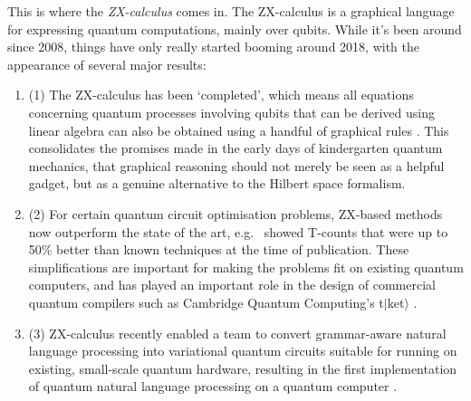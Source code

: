 \documentclass[11pt]{article}
\theoremstyle{definition}
\def\bR{\begin{color}{red}}
\def\bB{\begin{color}{blue}}
\def\e{\end{color}\xspace}
\newcommand{\ben}{\begin{enumerate}}
\newcommand{\een}{\end{enumerate}\par\noindent}
\newcommand{\TODOb}[1]{\marginpar{\scriptsize\bR \textbf{TODO:} #1\e}}
\begin{document}
This is where the \textit{ZX-calculus} comes in.
The ZX-calculus is a graphical language for expressing quantum computations, mainly over qubits. While it's been around since 2008, things have only really started booming around 2018, with the appearance of several major results: 
 \ben
 \item[(1)] The ZX-calculus has been `completed', which means all equations concerning quantum processes involving qubits that can be derived using linear algebra can also be obtained using a handful of graphical rules \cite{hadzihasanovic2018two, vilmart2019near}. This consolidates the promises made in the early days of kindergarten quantum mechanics, that graphical reasoning should not merely be seen as a helpful gadget, but as a genuine alternative to the Hilbert space formalism.
 \item[(2)] For certain quantum circuit optimisation  
 problems, 
 ZX-based methods now outperform the state of the art, e.g.~\cite{de2020fast} showed T-counts that were up to 50\% better than known techniques at the time of publication.  These simplifications are important for making the problems fit on existing quantum computers, and has played an important role in the design of commercial quantum compilers such as Cambridge Quantum Computing's t$|$ket$\rangle$ \cite{sivarajah2020t}. 
 \item[(3)] ZX-calculus recently enabled a team to convert grammar-aware natural language processing \cite{CSC} into variational quantum circuits \cite{QNLP-foundations} suitable for running on existing, small-scale quantum hardware, resulting in the first implementation of quantum natural language processing on a quantum computer \cite{Nature}.  %
 \een      
     
\end{document}
